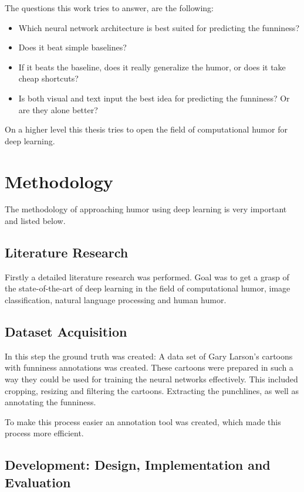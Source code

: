 \documentclass[draft,final,oneside]{vutinfth} %
\begin{document}
The questions this work tries to answer, are the following:

\begin{itemize}
\item Which neural network architecture is best suited for predicting the funniness?
\item Does it beat simple baselines?
\item If it beats the baseline, does it really generalize the humor, or does it take cheap shortcuts?
\item Is both visual and text input the best idea for predicting the funniness? Or are they alone better?
\end{itemize}

On a higher level this thesis tries to open the field of computational humor for deep learning.

\section{Methodology}

The methodology of approaching humor using deep learning is very important and listed below.

\subsection {Literature Research}

Firstly a detailed literature research was performed. Goal was to get a grasp of the state-of-the-art of deep learning in the field of computational humor, image classification, natural language processing and human humor.


\subsection {Dataset Acquisition}
In this step the ground truth was created: A data set of Gary Larson's cartoons with funniness annotations was created. These cartoons were prepared in such a way they could be used for training the neural networks effectively. This included cropping, resizing and filtering the cartoons. Extracting the punchlines, as well as annotating the funniness.

To make this process easier an annotation tool was created, which made this process more efficient.

\subsection{Development: Design, Implementation and Evaluation}
\end{document}
